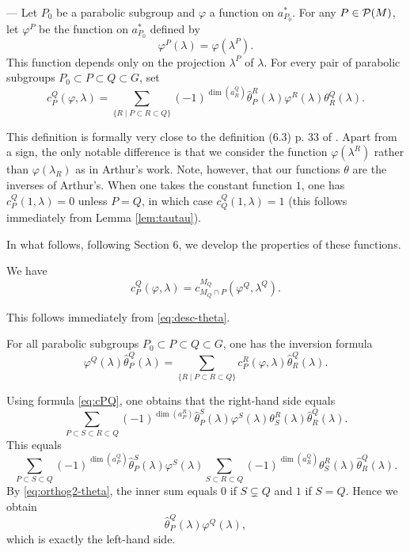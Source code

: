 \begin{paragr} ---\label{S:cphi}
  Let $P_0$ be a parabolic subgroup and $\varphi$ a function on $a_{P_0}^*$.  For any $P\in \mathcal{P}(M)$, let $\varphi^P$ be the function on $a_{P_0}^*$ defined by
$$\varphi^P(\lambda)=\varphi(\lambda^P).$$
This function depends only on the projection $\lambda^P$ of $\lambda$.
For every pair of parabolic subgroups $P_0\subset P\subset Q\subset G$, set
\begin{equation}
  \label{eq:cPQ}
  c_P^Q(\varphi,\lambda)=\sum_{\{R\mid P\subset R\subset Q  \}} (-1)^{\dim(a_R^Q)} \hat{\theta}_P^R(\lambda) \varphi^R(\lambda) \theta_R^Q(\lambda).
\end{equation}

\begin{remarque}
  This definition is formally very close to the definition (6.3) p. 33 of \cite{trace_inv}. Apart from a sign, the only notable difference is that we consider the function $\varphi(\lambda^R)$ rather than $\varphi(\lambda_R)$ as in Arthur's work. Note, however, that our functions $\theta$ are the inverses of Arthur's. When one takes the constant function $1$, one has $c_P^Q(1,\lambda)=0$ unless $P=Q$, in which case $c_Q^Q(1,\lambda)=1$ (this follows immediately from Lemma \ref{lem:tautau}).
\end{remarque}

In what follows, following \cite{trace_inv} Section 6, we develop the properties of these functions.

\begin{lemme} \label{lem:Levi} We have 
$$c_P^Q(\varphi,\lambda)=c_{M_Q\cap P}^{M_Q}(\varphi^Q,\lambda^Q).$$
\end{lemme}

\begin{preuve}
This follows immediately from \eqref{eq:desc-theta}.
\end{preuve}

\begin{lemme} For all parabolic subgroups $P_0\subset P\subset Q\subset G$, one has the inversion formula
$$ \varphi^Q(\lambda) \hat{\theta}_P^Q(\lambda)=\sum_{\{R\mid P\subset R\subset Q  \}}c_P^R(\varphi,\lambda)\hat{\theta}_R^Q(\lambda). $$
\end{lemme}

\begin{preuve}
Using formula \eqref{eq:cPQ}, one obtains that the right-hand side equals
$$\sum_{P\subset S\subset R\subset Q} (-1)^{\dim(a_P^R)} \hat{\theta}_P^S(\lambda) \varphi^S(\lambda) \theta_S^R(\lambda) \hat{\theta}_R^Q(\lambda).$$
This equals
$$\sum_{P\subset S\subset Q} (-1)^{\dim(a_P^Q)} \hat{\theta}_P^S(\lambda) \varphi^S(\lambda) \sum_{S\subset R\subset Q}(-1)^{\dim(a_R^Q)} \theta_S^R(\lambda) \hat{\theta}_R^Q(\lambda).$$
By \eqref{eq:orthog2-theta}, the inner sum equals $0$ if $S\subsetneq Q$ and $1$ if $S=Q$. Hence we obtain
$$ \hat{\theta}_P^Q(\lambda) \varphi^Q(\lambda),$$
which is exactly the left-hand side.
\end{preuve}


\end{paragr}
